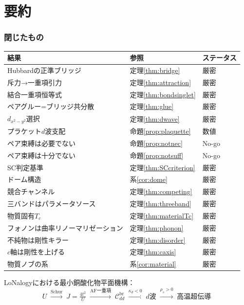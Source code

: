 \documentclass[12pt]{article}
\theoremstyle{plain}
\theoremstyle{definition}
\numberwithin{equation}{section}
\newcommand{\br}{\mathrm{br}}
\begin{document}
\part{要約}

\section{閉じたもの}\label{sec:closed}

\begin{center}
\begin{tabular}{lll}
\toprule
結果 & 参照 & ステータス\\
\midrule
Hubbardの正準ブリッジ & 定理\ref{thm:bridge} & 厳密\\
斥力→一重項引力 & 定理\ref{thm:attraction} & 厳密\\
結合一重項恒等式 & 定理\ref{thm:bondsinglet} & 厳密\\
ペアグルー=ブリッジ共分散 & 定理\ref{thm:glue} & 厳密\\
$d_{x^2-y^2}$選択 & 定理\ref{thm:dwave} & 厳密\\
プラケット$d$波支配 & 命題\ref{prop:plaquette} & 数値\\
ペア束縛は必要でない & 命題\ref{prop:notnec} & No-go\\
ペア束縛は十分でない & 命題\ref{prop:notsuff} & No-go\\
SC判定基準 & 定理\ref{thm:SCcriterion} & 厳密\\
ドーム構造 & 系\ref{cor:dome} & 厳密\\
競合チャンネル & 定理\ref{thm:competing} & 厳密\\
三バンドはパラメータソース & 定理\ref{thm:threeband} & 厳密\\
物質固有$T_c$ & 定理\ref{thm:materialTc} & 厳密\\
フォノンは曲率リノーマリゼーション & 定理\ref{thm:phonon} & 厳密\\
不純物は剛性キラー & 定理\ref{thm:disorder} & 厳密\\
$c$軸は剛性を上げる & 定理\ref{thm:caxis} & 厳密\\
物質ノブの系 & 系\ref{cor:material} & 厳密\\
\bottomrule
\end{tabular}
\end{center}

LoNalogyにおける最小銅酸化物平面機構：
\begin{equation}
\boxed{U
\;\xrightarrow{\text{Schur}}\;
J\!=\!\tfrac{4t^2}{U}
\;\xrightarrow{\text{AF一重項}}\;
\mathcal{C}_{dd}^{\br}
\;\xrightarrow{\kappa_d<0}\;
d\text{波}
\;\xrightarrow{\rho_s>0}\;
\text{高温超伝導}}
\end{equation}
\end{document}
